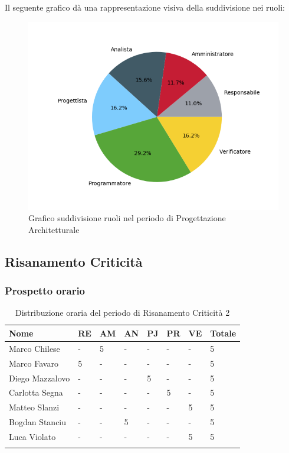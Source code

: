 Il seguente grafico dà una rappresentazione visiva della suddivisione nei ruoli:
\begin{figure}[H]
	\centering
  		\includegraphics[width=0.8\linewidth]{./images/torta_pa.png}
  		\caption{Grafico suddivisione ruoli nel periodo di Progettazione Architetturale}
  		\label{fig:grafico suddivione ruoli pa}
\end{figure}


\subsection{Risanamento Criticità}
\subsubsection{Prospetto orario}

\begin{longtable}{|C{.30\textwidth}|C{.06\textwidth}|C{.06\textwidth}|C{.06\textwidth} | C{.06\textwidth}| C{.06\textwidth} | C{.06\textwidth} | C{.10\textwidth} |}
\hline
\textbf{Nome} & \textbf{RE} & \textbf{AM} & \textbf{AN} & \textbf{PJ} & \textbf{PR} & \textbf{VE} & \textbf{Totale}\\
\hline 
Marco Chilese & - & 5 & - & - & - & - & 5 \\
\hline
Marco Favaro & 5 & - & - & - & - & - & 5 \\
\hline
Diego Mazzalovo & - & - & - & 5 & - & - & 5 \\
\hline
Carlotta Segna & - & - & - & - & 5 & - & 5 \\
\hline
Matteo Slanzi & - & - & - & - & - & 5 & 5 \\
\hline
Bogdan Stanciu & - & - & 5 & - & - & - & 5 \\
\hline
Luca Violato & - & - & - & - & - & 5 & 5 \\   
\hline


\caption{Distribuzione oraria del periodo di Risanamento Criticità 2}
\label{Distribuzione oraria rc2}
\end{longtable}

